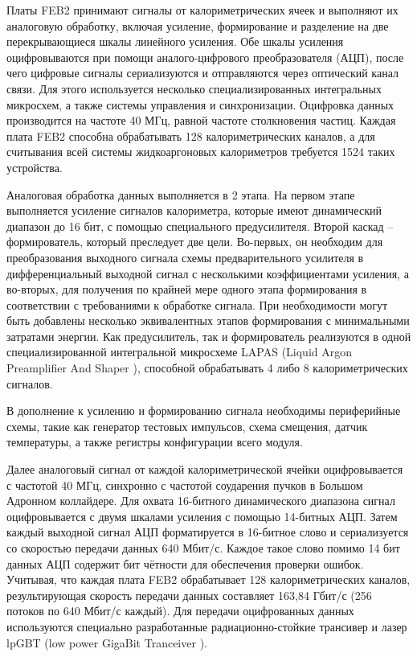 Платы FEB2 принимают сигналы от калориметрических ячеек и выполняют их аналоговую обработку, включая усиление, формирование и разделение на две перекрывающиеся шкалы линейного усиления. Обе шкалы усиления оцифровываются при помощи аналого-цифрового преобразователя (АЦП), после чего цифровые сигналы сериализуются и отправляются через оптический канал связи. Для этого используется несколько специализированных интегральных микросхем, а также системы управления и синхронизации. Оцифровка данных производится на частоте 40 МГц, равной частоте столкновения частиц. Каждая плата FEB2 способна обрабатывать 128 калориметрических каналов, а для считывания всей системы жидкоаргоновых калориметров требуется 1524 таких устройства.\par
Аналоговая обработка данных выполняется в 2 этапа. На первом этапе выполняется усиление сигналов калориметра, которые имеют динамический диапазон до 16 бит, с помощью специального предусилителя. Второй каскад -- формирователь, который преследует две цели. Во-первых, он необходим для преобразования выходного сигнала схемы предварительного усилителя в дифференциальный выходной сигнал с несколькими коэффициентами усиления, а во-вторых, для получения по крайней мере одного этапа формирования в соответствии с требованиями к обработке сигнала. При необходимости могут быть добавлены несколько эквивалентных этапов формирования с минимальными затратами энергии. Как предусилитель, так и формирователь реализуются в одной специализированной интегральной микросхеме LAPAS (Liquid Argon Preamplifier And Shaper \parencite{lapas}), способной обрабатывать 4 либо 8 калориметрических сигналов.\par
В дополнение к усилению и формированию сигнала необходимы периферийные схемы, такие как генератор тестовых импульсов, схема смещения, датчик температуры, а также регистры конфигурации всего модуля.\par
Далее аналоговый сигнал от каждой калориметрической ячейки оцифровывается с частотой 40 МГц, синхронно с частотой соударения пучков в Большом Адронном коллайдере. Для охвата 16-битного динамического диапазона сигнал оцифровывается с двумя шкалами усиления с помощью 14-битных АЦП. Затем каждый выходной сигнал АЦП форматируется в 16-битное слово и сериализуется со скоростью передачи данных 640 Мбит/с. Каждое такое слово помимо 14 бит данных АЦП содержит бит чётности для обеспечения проверки ошибок. Учитывая, что каждая плата FEB2 обрабатывает 128 калориметрических каналов, результирующая скорость передачи данных составляет 163,84 Гбит/с (256 потоков по 640 Мбит/с каждый). Для передачи оцифрованных данных используются специально разработанные радиационно-стойкие трансивер и лазер lpGBT (low power GigaBit Tranceiver \parencite{lpgbt}). \par
